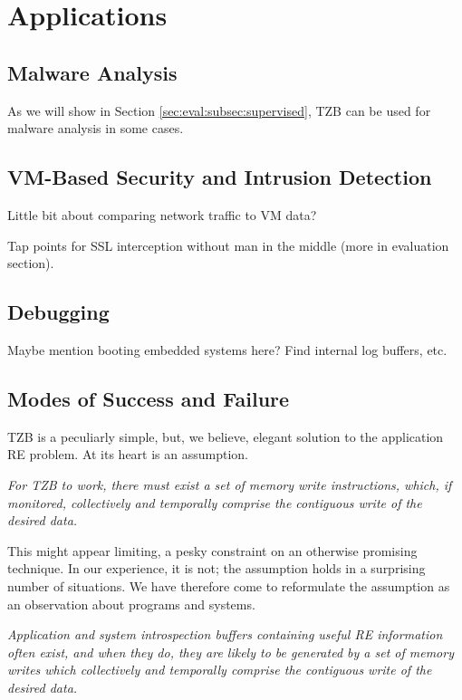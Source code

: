 \section{Applications}

\subsection{Malware Analysis}

As we will show in Section \ref{sec:eval:subsec:supervised}, TZB can be used for malware analysis in some cases.

\subsection{VM-Based Security and Intrusion Detection}

Little bit about comparing network traffic to VM data?

Tap points for SSL interception without man in the middle (more in evaluation section).

\subsection{Debugging}

Maybe mention booting embedded systems here? Find internal log buffers, etc.


\subsection{Modes of Success and Failure}

TZB is a peculiarly simple, but, we believe, elegant solution to the application RE problem.  
At its heart is an assumption.

\emph{For TZB to work, there must exist a set of memory write instructions, which, if monitored, collectively and temporally comprise the contiguous write of the desired data.}

This might appear limiting, a pesky constraint on an otherwise promising technique.
In our experience, it is not; the assumption holds in a surprising number of situations.
We have therefore come to reformulate the assumption as an observation about programs and systems.  

\emph{Application and system introspection buffers containing useful RE information often exist, and when they do, they are likely to be generated by a set of memory writes which collectively and temporally comprise the contiguous write of the desired data.}

